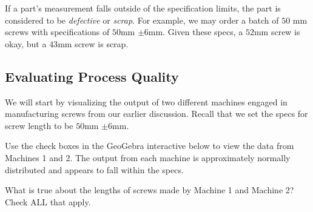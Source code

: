 \documentclass{ximera}
\begin{document}
\begin{center}
      \end{center}

If a part's measurement falls outside of the specification limits, the part is considered to be \emph{defective} or \emph{scrap}.  For example, we may order a batch of $50$ mm screws with specifications of $50$mm $\pm 6$mm.   Given these specs, a $52$mm screw is okay, but a $43$mm screw is scrap.

\subsection*{Evaluating Process Quality}
We will start by visualizing the output of two different machines engaged in manufacturing screws from our earlier discussion.  Recall that we set the specs for screw length to be $50$mm $\pm 6$mm.  

Use the check boxes in the GeoGebra interactive below to view the data from Machines 1 and 2.  The output from each machine is approximately normally distributed and appears to fall within the specs.  

\begin{onlineOnly}
\begin{center} 
\end{center}
\end{onlineOnly}

\begin{question}\label{quest:compareMachines}
    What is true about the lengths of screws made by Machine 1 and Machine 2?  Check ALL that apply.
    \begin{selectAll}
    \end{selectAll}
\end{question}
\end{document}
